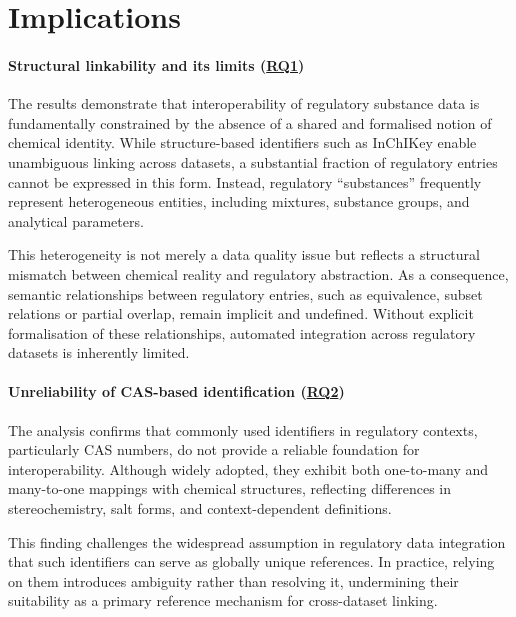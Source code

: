 \section{Implications}
\label{sec:discussion}

\paragraph{Structural linkability and its limits (\texorpdfstring{\hyperref[sec:question1]{RQ1}}{RQ1})}

The results demonstrate that interoperability of regulatory substance data is fundamentally constrained by the absence of a shared and formalised notion of chemical identity. While structure-based identifiers such as InChIKey enable unambiguous linking across datasets, a substantial fraction of regulatory entries cannot be expressed in this form. Instead, regulatory “substances” frequently represent heterogeneous entities, including mixtures, substance groups, and analytical parameters.

This heterogeneity is not merely a data quality issue but reflects a structural mismatch between chemical reality and regulatory abstraction. As a consequence, semantic relationships between regulatory entries, such as equivalence, subset relations or partial overlap, remain implicit and undefined. Without explicit formalisation of these relationships, automated integration across regulatory datasets is inherently limited.

\paragraph{Unreliability of CAS-based identification (\texorpdfstring{\hyperref[sec:question2]{RQ2}}{RQ2})}

The analysis confirms that commonly used identifiers in regulatory contexts, particularly CAS numbers, do not provide a reliable foundation for interoperability. Although widely adopted, they exhibit both one-to-many and many-to-one mappings with chemical structures, reflecting differences in stereochemistry, salt forms, and context-dependent definitions.

This finding challenges the widespread assumption in regulatory data integration that such identifiers can serve as globally unique references. In practice, relying on them introduces ambiguity rather than resolving it, undermining their suitability as a primary reference mechanism for cross-dataset linking.

